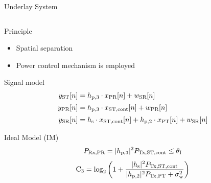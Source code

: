 \documentclass[16pt]{beamer}
\begin{document}
\begin{frame}[t]{Underlay System}
	\begin{columns}
		\begin{column}{0.5\columnwidth}
			\begin{block}{\footnotesize Principle} %
				\begin{itemize}
					\item Spatial separation \item Power control mechanism is employed 
				\end{itemize}
			\end{block}
			\vspace{2mm}
			{
				\begin{block}{\footnotesize Signal model} %
				\vspace{-3mm}
				\begin{align*}
					y_{\text{ST}}[n] &= h_{\text{p,3}} \cdot x_{\text{PR}}[n] + w_{\text{SR}}[n] \\[.2em]
					y_{\text{PR}}[n] &= h_{\text{p,3}}  \cdot x_{\text{ST,cont}}[n] + w_{\text{PR}}[n] \\[.2em]
					y_{\text{SR}}[n] &= h_{\text{s}} \cdot x_{\text{ST,cont}}[n] + h_{\text{p,2}} \cdot x_{\text{PT}}[n] + w_{\text{SR}}[n]
				\end{align*}
				\end{block}
				\vspace{2mm}
				\begin{block}{\footnotesize Ideal Model (IM)} 
				\begin{equation*}
					P_{\text{Rx,PR}} = {{|h_{\text{p,3}}|^2}} P_{\text{Tx,ST,cont}} \le \theta_{\text{I}}
				\end{equation*}	
				\begin{equation*}
					\text{C}_{\text{3}} = \log_2 \left(1 + \frac{{{|h_{\text{s}}|^2}} P_{\text{Tx,ST,cont}}}{ {{|h_{\text{p,2}}|^2}} P_{\text{Tx,PT}} + \sigma^2_{\text{w}}} \right)	
				\end{equation*}	
				\end{block}	
			}
			{

}
\end{column}
\end{columns}
\end{frame}
\end{document}
